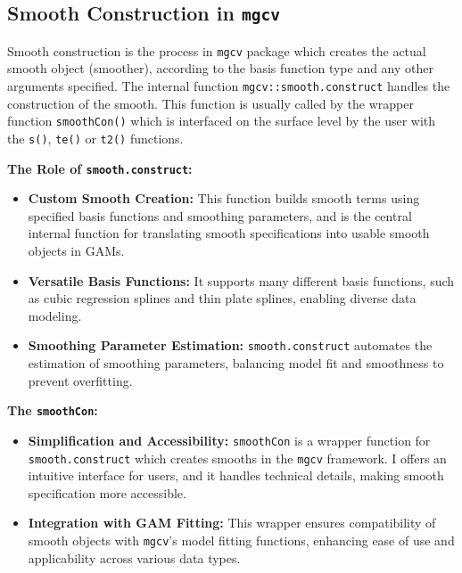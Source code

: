\documentclass[12pt, twoside,hidelinks]{article}
\theoremstyle{definition}
\numberwithin{equation}{section}
\begin{document}
\subsection{Smooth Construction in \texttt{mgcv}}\label{sec:rpack:smoothcon}

Smooth construction is the process in \texttt{mgcv} package which creates the actual smooth object (smoother), according to the basis function type and any other arguments specified. The internal function \texttt{mgcv::smooth.construct} handles the construction of the smooth. This function is usually called by the wrapper function \texttt{smoothCon()} which is interfaced on the surface level by the user with the \texttt{s()}, \texttt{te()} or \texttt{t2()} functions.

\textbf{The Role of \texttt{smooth.construct}:}
\begin{itemize}
    \item \textbf{Custom Smooth Creation:} This function builds smooth terms using specified basis functions and smoothing parameters, and is the central internal function for translating smooth specifications into usable smooth objects in GAMs.
    
    \item \textbf{Versatile Basis Functions:} It supports many different basis functions, such as cubic regression splines and thin plate splines, enabling diverse data modeling.
    
    \item \textbf{Smoothing Parameter Estimation:} \texttt{smooth.construct} automates the estimation of smoothing parameters, balancing model fit and smoothness to prevent overfitting.
\end{itemize}

\textbf{The \texttt{smoothCon}:}
\begin{itemize}
    \item \textbf{Simplification and Accessibility:} \texttt{smoothCon} is a wrapper function for \texttt{smooth.construct} which creates smooths in the \texttt{mgcv} framework. I offers an intuitive interface for users, and it handles technical details, making smooth specification more accessible.
    
    \item \textbf{Integration with GAM Fitting:} This wrapper ensures compatibility of smooth objects with \texttt{mgcv}'s model fitting functions, enhancing ease of use and applicability across various data types.
\end{itemize}
\end{document}
